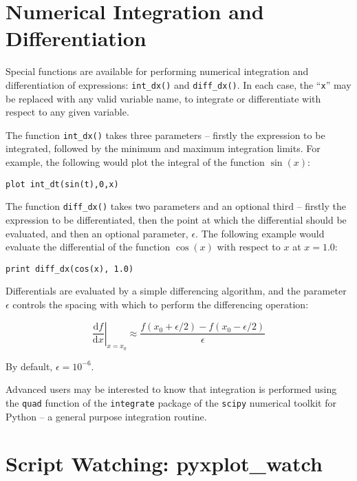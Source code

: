 \documentclass[a4paper,onecolumn,11pt]{book}
\begin{document}
\section{Numerical Integration and Differentiation}

Special functions are available for performing numerical integration and
differentiation of expressions: \texttt{int\_dx()} and
\texttt{diff\_dx()}. In each case, the ``\texttt{x}'' may be
replaced with any valid variable name, to integrate or differentiate with
respect to any given variable.

The function \texttt{int\_dx()} takes three parameters -- firstly the
expression to be integrated, followed by the minimum and maximum integration
limits. For example, the following would plot the integral of the function
$\sin(x)$:

\begin{verbatim}
plot int_dt(sin(t),0,x)
\end{verbatim} 

The function \texttt{diff\_dx()} takes two parameters and an optional third --
firstly the expression to be differentiated, then the point at which the
differential should be evaluated, and then an optional parameter, $\epsilon$.
The following example would evaluate the differential of the function $\cos(x)$
with respect to $x$ at $x=1.0$:

\begin{verbatim}
print diff_dx(cos(x), 1.0)
\end{verbatim}

Differentials are evaluated by a simple differencing algorithm, and the
parameter $\epsilon$ controls the spacing with which to perform the
differencing operation:

\begin{displaymath}
\left.\frac{\mathrm{d}f}{\mathrm{d}x}\right|_{x=x_0} \approx \frac{f(x_0+\epsilon/2) - f(x_0-\epsilon/2)}{\epsilon}
\end{displaymath}

\noindent By default, $\epsilon = 10^{-6}$.

Advanced users may be interested to know that integration is performed using
the \texttt{quad} function of the \texttt{integrate} package of the
\texttt{scipy} numerical toolkit for Python -- a general purpose integration
routine.

\section{Script Watching: pyxplot\_watch}
\end{document}
